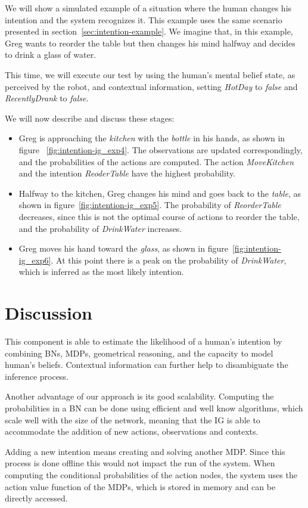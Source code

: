 We will show a simulated example of a situation where the human changes his intention and the system recognizes it. This example uses the same scenario presented in section~\ref{sec:intention-example}. We imagine that, in this example, Greg wants to reorder the table but then changes his mind halfway and decides to drink a glass of water.

This time, we will execute our test by using the human's mental belief state, as perceived by the robot, and contextual information, setting \textit{HotDay} to \textit{false} and \textit{RecentlyDrank} to \textit{false}.

We will now describe and discuss these stages:
\begin{itemize}
    \item Greg is approaching the \textit{kitchen} with the \textit{bottle} in his hands, as shown in figure ~\ref{fig:intention-ig_exp4}. The observations are updated correspondingly, and the probabilities of the actions are computed. The action \textit{MoveKitchen} and the intention \textit{ReoderTable} have the highest probability. 
    \item Halfway to the kitchen, Greg changes his mind and goes back to the \textit{table}, as shown in figure~\ref{fig:intention-ig_exp5}. The probability of \textit{ReorderTable} decreases, since this is not the optimal course of actions to reorder the table, and the probability of \textit{DrinkWater} increases. 
    \item Greg moves his hand toward the \textit{glass}, as shown in figure~\ref{fig:intention-ig_exp6}. At this point there is a peak on the probability of \textit{DrinkWater}, which is inferred as the most likely intention. 
\end{itemize}


\section{Discussion}

This component is able to estimate the likelihood of a human's intention by combining BNs, MDPs, geometrical reasoning, and the capacity to model human's beliefs. Contextual information can further help to disambiguate the inference process. 

Another advantage of our approach is its good scalability. Computing the probabilities in a BN can be done using efficient and well know algorithms, which scale well with the size of the network, meaning that the IG is able to accommodate the addition of new actions, observations and contexts. 

Adding a new intention means creating and solving another MDP. Since this process is done offline this would not impact the run of the system. When computing the conditional probabilities of the action nodes, the system uses the action value function of the MDPs, which is stored in memory and can be directly accessed.
